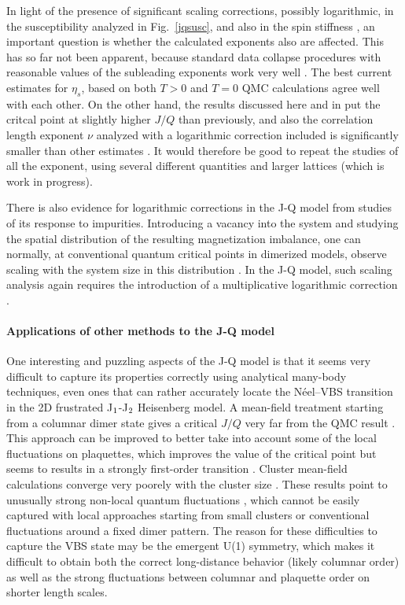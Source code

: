 \documentclass[draft,numberedheadings]{aipproc}
\begin{document}
In light of the presence of significant scaling corrections, possibly logarithmic, in the susceptibility analyzed in Fig.~\ref{jqsusc}, and also in the spin 
stiffness \cite{sandviklogs}, an important question is whether the calculated  exponents also are affected. This has so far not been apparent, because 
standard data collapse procedures with reasonable values of the subleading exponents work very well \cite{lou1}. The best current estimates for $\eta_s$, 
based on both $T>0$ \cite{melko08a} and $T=0$ \cite{lou1} QMC calculations agree well with each other. On the other hand, the results discussed here 
and in \cite{sandviklogs} put the critcal point at slightly higher $J/Q$ than previously, and also the correlation length exponent $\nu$ analyzed with 
a logarithmic correction included \cite{sandviklogs} is significantly smaller than other estimates \cite{melko08a,lou1}. It would therefore be good to repeat 
the studies of all the exponent, using several different quantities and larger lattices (which is work in progress).

There is also evidence for logarithmic corrections in the J-Q model from studies of its response to impurities. Introducing a vacancy into the
system and studying the spatial distribution of the resulting magnetization imbalance, one can normally, at conventional quantum critical points 
in dimerized models, observe scaling with the system size in this distribution \cite{hoglund07,banerjee10}. In the J-Q model, such scaling analysis
again requires the introduction of a multiplicative logarithmic correction \cite{banerjee10}.

\paragraph{Applications of other methods to the J-Q model}

One interesting and puzzling aspects of the J-Q model is that it seems very difficult to capture its properties correctly using 
analytical many-body techniques, even ones that can rather accurately locate the N\'eel--VBS transition in the 2D frustrated J$_{\rm 1}$-J$_{\rm 2}$ 
Heisenberg model. A mean-field treatment starting from a columnar dimer state gives a critical $J/Q$ very far from the QMC 
result \cite{kotov09}. This approach can be improved to better take into account some of the local fluctuations on plaquettes, which
improves the value of the critical point but seems to results in a strongly first-order transition \cite{kotov09}. Cluster mean-field 
calculations converge very poorely with the cluster size \cite{isaev09}. These results point to unusually strong non-local quantum fluctuations 
\cite{kotov09}, which cannot be easily captured with local approaches starting from small clusters or conventional fluctuations 
around a fixed dimer pattern. The reason for these difficulties to capture the VBS state may be the emergent U(1) symmetry, which makes 
it difficult to obtain both the correct long-distance behavior (likely columnar order) as well as the strong fluctuations between 
columnar and plaquette order on shorter length scales.
\end{document}
